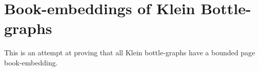 \section{Book-embeddings of Klein Bottle-graphs}

This is an attempt at proving that all Klein bottle-graphs have a bounded page book-embedding. 

